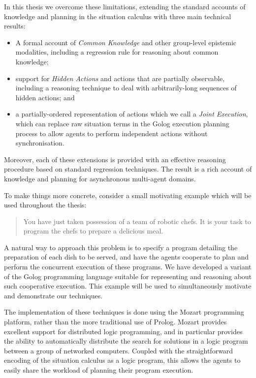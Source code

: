 In this thesis we overcome these limitations, extending the standard
accounts of knowledge and planning in the situation calculus with
three main technical results:

\begin{itemize}
\item A formal account of \emph{Common Knowledge} and other group-level
epistemic modalities, including a regression rule for reasoning about
common knowledge; 
\item support for \emph{Hidden Actions} and actions that are partially observable,
including a reasoning technique to deal with arbitrarily-long sequences
of hidden actions; and 
\item a partially-ordered representation of actions which we call a \emph{Joint
Execution}, which can replace raw situation terms in the Golog execution
planning process to allow agents to perform independent actions without
synchronisation. 
\end{itemize}
Moreover, each of these extensions is provided with an effective reasoning
procedure based on standard regression techniques. The result is a
rich account of knowledge and planning for asynchronous multi-agent
domains.

To make things more concrete, consider a small motivating example
which will be used throughout the thesis:

\begin{quote}
You have just taken possession of a team of robotic chefs. It is your
task to program the chefs to prepare a delicious meal. 
\end{quote}
A natural way to approach this problem is to specify a program detailing
the preparation of each dish to be served, and have the agents cooperate
to plan and perform the concurrent execution of these programs. We
have developed a variant of the Golog programming language suitable
for representing and reasoning about such cooperative execution. This
example will be used to simultaneously motivate and demonstrate our
techniques.

The implementation of these techniques is done using the Mozart programming
platform, rather than the more traditional use of Prolog. Mozart provides
excellent support for distributed logic programming, and in particular
provides the ability to automatically distribute the search for solutions
in a logic program between a group of networked computers. Coupled
with the straightforward encoding of the situation calculus as a logic
program, this allows the agents to easily share the workload of planning
their program execution.\newpage{}

